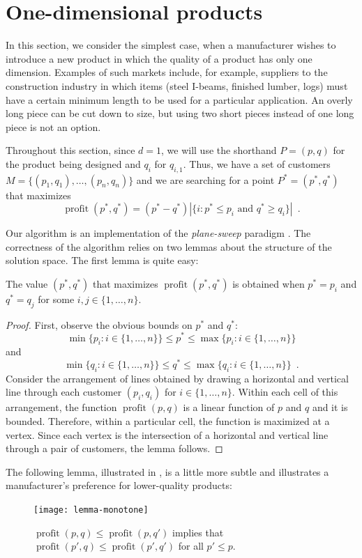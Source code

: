 \documentclass[lotsofwhite]{patmorin}
\newcommand{\val}{\operatorname{profit}}
\begin{document}
\section{One-dimensional products}

In this section, we consider the simplest case, when a manufacturer
wishes to introduce a new product in which the quality of a product
has only one dimension.  Examples of such markets include, for example,
suppliers to the construction industry in which items (steel I-beams,
finished lumber, logs) must have a certain minimum length to be used for
a particular application.  An overly long piece can be cut down to size,
but using two short pieces instead of one long piece is not an option.

Throughout this section, since $d=1$, we will use the shorthand $P=(p,q)$
for the product being designed and $q_i$ for $q_{i,1}$.  Thus, we have a
set of customers $M=\{(p_1,q_1),\ldots,(p_{n},q_n)\}$ and we are searching
for a point $P^*=(p^*,q^*)$ that maximizes 
\[
   \val(p^*,q^*) = (p^*-q^*)
     |\{i : \mbox{$p^*\le p_i$ and $q^*\ge q_i$}\}|  \enspace .
\]

Our algorithm is an implementation of the \emph{plane-sweep} paradigm
\cite{bo79}. The correctness of the algorithm relies on two lemmas about
the structure of the solution space.  The first lemma is quite easy:
\begin{lem}
  The value $(p^*,q^*)$ that maximizes $\val(p^*,q^*)$ is obtained when
  $p^* = p_i$ and $q^*=q_j$ for some $i,j\in\{1,\ldots,n\}$.
\end{lem}

\begin{proof}
  First, observe the obvious bounds on $p^*$ and $q^*$:
  \[
     \min\{p_i:i\in\{1,\ldots,n\}\} \le p^* 
      \le \max\{p_i:i\in\{1,\ldots,n\}\} 
  \] 
  and 
  \[
     \min\{q_i:i\in\{1,\ldots,n\}\} \le q^* 
      \le \max\{q_i:i\in\{1,\ldots,n\}\} \enspace .
  \] 
  Consider the arrangement of lines obtained by drawing a
  horizontal and vertical line through each customer $(p_i,q_i)$
  for $i\in\{1,\ldots,n\}$.  Within each cell of this arrangement,
  the function $\val(p,q)$ is a linear function of $p$ and $q$ and it is
  bounded.  Therefore, within a particular cell, the function is maximized
  at a vertex.  Since each vertex is the intersection of a horizontal
  and vertical line through a pair of customers, the lemma follows.
\end{proof}

The following lemma, illustrated in , is a
little more subtle and illustrates a manufacturer's preference for
lower-quality products:
\begin{figure}
  \begin{center}
    \texttt{[image: lemma-monotone]}
  \end{center}
  \caption{$\val(p,q) \le \val(p,q')$ implies that $\val(p',q) \le
           \val(p',q')$ for all $p' \le p$.}
\end{figure}
\end{document}
